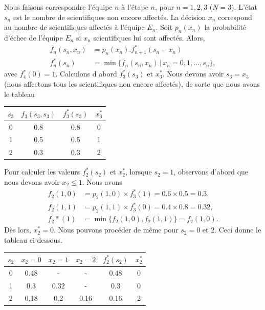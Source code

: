 \begin{example}
Nous faisons correspondre l'équipe $n$ à l'étape $n$, pour $n = 1,2,3$ ($N = 3$).
L'état $s_n$ est le nombre de scientifiques non encore affectés.
La décision $x_n$ correspond au nombre de scientifiques affectés à l'équipe $E_n$.
Soit $p_n(x_n)$ la probabilité d'échec de l'équipe $E_n$ si $x_n$ scientifiques lui sont affectés.
Alors,
\begin{align*}
 f_n(s_n,x_n) &= p_n(x_n).f_{n+1}^*(s_n-x_n) \\
 f_n^*(s_n) &= \min \lbrace f_n(s_n,x_n)\,|\,x_n=0,1,\ldots,s_n \rbrace,
\end{align*}
avec $f_4^*(0) = 1$.
Calculons d abord $f_3^*(s_3)$ et $x_3^*$.
Nous devons avoir $s_3 = x_3$ (nous affectons tous les scientifiques non encore affectés),
de sorte que nous avons le tableau
\begin{center}
\begin{tabular}{|c|c|c|c|}
\hline
$s_3$ & $f_3(s_3,s_3)$ & $f_3^*(s_3)$ & $x_3^*$ \\
\hline
0 & 0.8 & 0.8 & 0 \\
\hline
1 & 0.5 & 0.5 & 1 \\
\hline
2 & 0.3 & 0.3 & 2 \\
\hline
\end{tabular}
\end{center}
Pour calculer les valeurs $f_2^*(s_2)$ et $x_2^*$, lorsque $s_2 = 1$, observons d'abord que nous devons avoir $x_2 \leq 1$. Nous avons
\begin{align*}
 f_2(1,0) &= p_2(1,0) \times f_3^*(1) = 0.6 \times 0.5 = 0.3, \\
 f_2(1,1) &= p_2(1,1) \times f_3^*(0) = 0.4 \times 0.8 = 0.32, \\
 f_2*(1) &= \min \lbrace f_2(1,0), f_2(1,1) \rbrace = f_2(1,0).
\end{align*}
Dès lors, $x_2^* = 0$.
Nous pouvons procéder de même pour $s_2 = 0$ et $2$.
Ceci donne le tableau ci-dessous.
\begin{center}
\begin{tabular}{|c|c|c|c|c|c|}
\hline
$s_2$ & $x_2 = 0$ & $x_2 = 1$ & $x_2 = 2$ & $f_2^*(s_2)$ & $x_2^*$ \\
\hline
0 & 0.48 & - & - & 0.48 & 0 \\
\hline
1 & 0.3 & 0.32 & - & 0.3 & 0 \\
\hline
2 & 0.18 & 0.2 & 0.16 & 0.16 & 2 \\
\hline
\end{tabular}
\end{center}


\end{example}
